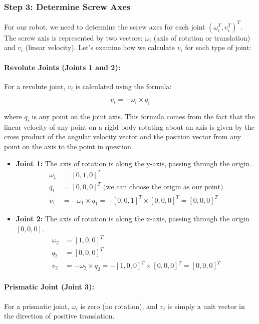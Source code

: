 \begin{solution}
\subsubsection*{Step 3: Determine Screw Axes}
For our robot, we need to determine the screw axes for each joint $(\omega_i^T , v_i^T)^T $. The screw axis is represented by two vectors: $\omega_i$ (axis of rotation or translation) and $v_i$ (linear velocity). Let's examine how we calculate $v_i$ for each type of joint:

\paragraph{Revolute Joints (Joints 1 and 2):}
For a revolute joint, $v_i$ is calculated using the formula:

\begin{equation}
v_i = -\omega_i \times q_i
\end{equation}

where $q_i$ is any point on the joint axis. This formula comes from the fact that the linear velocity of any point on a rigid body rotating about an axis is given by the cross product of the angular velocity vector and the position vector from any point on the axis to the point in question.

\begin{itemize}
	\item \textbf{Joint 1:} The axis of rotation is along the y-axis, passing through the origin.
	\begin{align*}
	\omega_1 &= [0, 1, 0]^T \\
	q_1 &= [0, 0, 0]^T \text{ (we can choose the origin as our point)} \\
	v_1 &= -\omega_1 \times q_1 = -[0, 0, 1]^T \times [0, 0, 0]^T = [0, 0, 0]^T
	\end{align*}
	
	\item \textbf{Joint 2:} The axis of rotation is along the x-axis, passing through the origin $[0, 0, 0]$.
	\begin{align*}
	\omega_2 &= [1, 0, 0]^T \\
	q_2 &= [0, 0, 0]^T \\
	v_2 &= -\omega_2 \times q_2 = -[1, 0, 0]^T \times [0, 0, 0]^T = [0, 0, 0]^T
	\end{align*}
\end{itemize}

\paragraph{Prismatic Joint (Joint 3):}
For a prismatic joint, $\omega_i$ is zero (no rotation), and $v_i$ is simply a unit vector in the direction of positive translation.


\end{solution}
